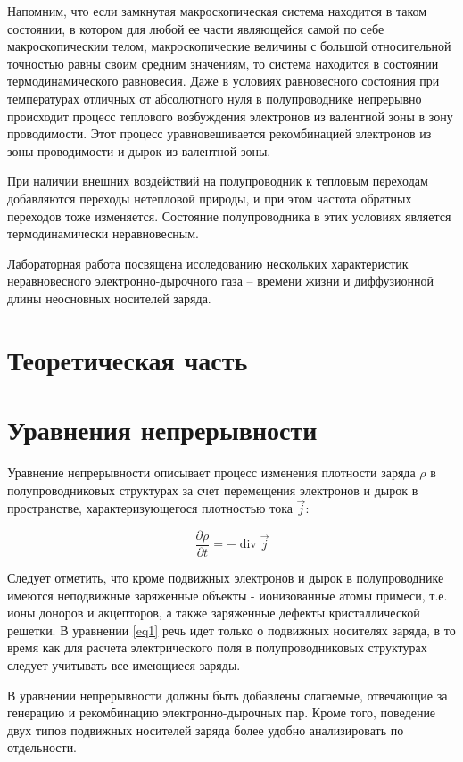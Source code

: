 Напомним, что если замкнутая макроскопическая система находится в таком состоянии, в котором для любой ее части
являющейся самой по себе макроскопическим телом, макроскопические величины с большой относительной точностью равны своим
средним значениям, то система находится в состоянии термодинамического равновесия. Даже в условиях
равновесного состояния при температурах отличных от абсолютного нуля в полупроводнике непрерывно происходит процесс
теплового возбуждения электронов из валентной зоны в зону проводимости. Этот процесс уравновешивается рекомбинацией
электронов из зоны проводимости и дырок из валентной зоны.

При наличии внешних воздействий на полупроводник к тепловым переходам добавляются переходы нетепловой природы, и при
этом частота обратных переходов тоже изменяется. Состояние полупроводника в этих условиях является термодинамически
неравновесным.

Лабораторная работа посвящена исследованию нескольких характеристик неравновесного электронно-дырочного газа -- времени
жизни и диффузионной длины неосновных носителей заряда.

\section*{Теоретическая часть}
\section{Уравнения непрерывности}

Уравнение непрерывности описывает процесс изменения плотности заряда $\rho$ в полупроводниковых структурах за счет
перемещения электронов и дырок в пространстве, характеризующегося плотностью тока $\vec{j}$:

\begin{equation}
	\label{eq1}
	\frac{\partial \rho}{\partial t}=-\operatorname{div} \vec{j}
\end{equation}

Следует отметить, что кроме подвижных электронов и дырок в полупроводнике имеются неподвижные заряженные объекты -
ионизованные атомы примеси, т.е. ионы доноров и акцепторов, а также заряженные дефекты кристаллической решетки. В
уравнении \eqref{eq1} речь идет только о подвижных носителях заряда, в то время как для расчета электрического поля в
полупроводниковых структурах следует учитывать все имеющиеся заряды.

В уравнении непрерывности должны быть добавлены слагаемые, отвечающие за генерацию и рекомбинацию электронно-дырочных пар. Кроме того, поведение
двух типов подвижных носителей заряда более удобно анализировать по отдельности.

